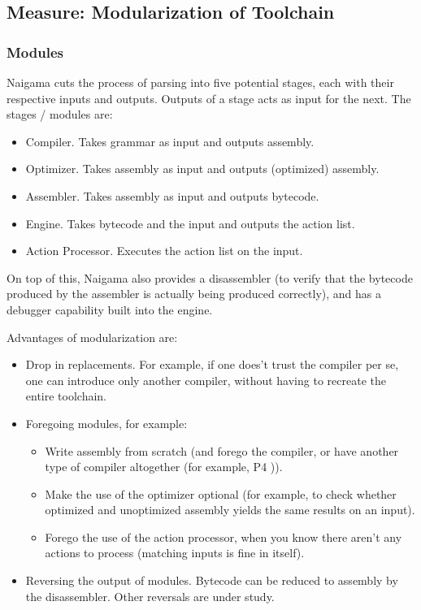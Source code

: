 \subsection{Measure: Modularization of Toolchain}

\subsubsection{Modules}
Naigama cuts the process of parsing into five potential stages, each with
their respective inputs and outputs. Outputs of a stage acts as input
for the next. The stages / modules are:

\begin{itemize}
\item{Compiler. Takes grammar as input and outputs assembly.}
\item{Optimizer. Takes assembly as input and outputs (optimized) assembly.}
\item{Assembler. Takes assembly as input and outputs bytecode.}
\item{Engine. Takes bytecode and the input and outputs the action list.}
\item{Action Processor. Executes the action list on the input.}
\end{itemize}

On top of this, Naigama also provides a disassembler (to verify that
the bytecode produced by the assembler is actually being produced correctly),
and has a debugger capability built into the engine.

Advantages of modularization are:

\begin{itemize}
\item{Drop in replacements. For example, if one does't trust the compiler
      per se, one can introduce only another compiler, without having to
      recreate the entire toolchain.}
\item{Foregoing modules, for example:}
  \begin{itemize}
  \item{Write assembly from scratch (and forego the compiler, or have
        another type of compiler altogether (for example, P4 \cite{bib:p4})).}
  \item{Make the use of the optimizer optional (for example, to check
        whether optimized and unoptimized assembly yields the same results
        on an input).}
  \item{Forego the use of the action processor, when you know there aren't
        any actions to process (matching inputs is fine in itself).}
  \end{itemize}
\item{Reversing the output of modules. Bytecode can be reduced to assembly
      by the disassembler. Other reversals are under study.}
\end{itemize}


